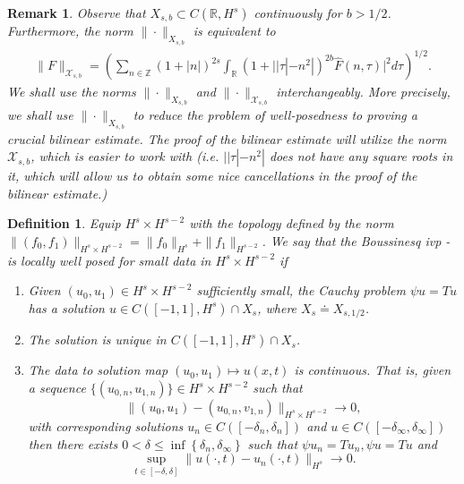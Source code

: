 \documentclass[12pt,reqno]{amsart}
\numberwithin{equation}{section}  %
\renewcommand{\cref}{\Cref}
\newcommand{\rr}{\mathbb{R}}
\newcommand{\zz}{\mathbb{Z}}
\newcommand{\wh}{\widehat}
\newtheorem{definition}[theorem]{Definition}
\newtheorem{remark}[theorem]{Remark}
\begin{document}
%
\begin{remark}
  Observe that $X_{s,b} \subset C(\rr, H^{s})$ continuously for $b>1/2$. Furthermore, the norm $\| \cdot \|_{X_{s,b}}$ is equivalent to
  \begin{equation*}
  \begin{split}
    \| F \|_{\mathcal{X}_{s,b}}
    = \left( \sum_{n \in \zz} (1 + |n|)^{2s} \int_{\rr}
    (1 + ||\tau| - n^{2} |)^{2b} \wh{F}(n, \tau)|^{2} d \tau\right)^{1/2}.
  \end{split}
  \end{equation*}
  We shall use the norms $\| \cdot \|_{X_{s,b}}$ and $\| \cdot \|_{\mathcal{X}_{s,b}}$ interchangeably. More precisely, we shall use $\| \cdot \|_{X_{s,b}}$ to reduce the problem of well-posedness to proving a crucial bilinear estimate. The proof of the bilinear estimate will utilize the norm $\mathcal{X}_{s,b}$, which is easier to work with (i.e. $ | | \tau | - n^{2} |$ does not have any square roots in it, which will allow us to obtain some nice cancellations in the proof of the bilinear estimate.)   
\end{remark}
%
%
%
%
%
%
%
%
\begin{definition}
  Equip $H^{s} \times H^{s-2}$ with the 
  topology defined by the norm $\|(f_0, f_1)\|_{H^{s} \times H^{s-2}}
  = \|f_0\|_{H^{s}} + \|f_1\|_{H^{s-2}}$.
   We say that the Boussinesq ivp
  \cref{eqn:mb-2}-\cref{eqn:mb-init-data-2} is
	\emph{locally well posed} for small data in
  $H^s \times H^{s-2}$ if 
	\begin{enumerate}
    \item Given $(u_{0}, u_{1}) \in H^{s} \times H^{s-2}$
      sufficiently small, the Cauchy problem
      $\psi u = Tu$ has a solution $u \in C([-1,
      1], H^s) \cap X_{s}$, where $X_{s} \doteq X_{s,1/2}$. 
    \item The solution is unique in $C([-1, 1], H^{s}) \cap
      X_{s}$.
    \item
      The data to solution map $(u_0, u_{1}) \mapsto u(x,t)$ is continuous. That
      is, given a sequence $\{(u_{0,n}, u_{1,n} ) \} \in H^{s} \times H^{s-2}$
      such that $$\|(u_{0}, u_{1})
      - (u_{0,n}, v_{1,n}) \|_{H^{s} \times
      H^{s-2}} \to 0,$$ with corresponding solutions $u_{n} \in
      C([-\delta_{n},
      \delta_{n}])$ and $u \in C([-\delta_{\infty}, \delta_{\infty}])$
      then there exists $0 < \delta \le \inf\left\{
      \delta_{n}, \delta_{\infty} \right\}$ such that $\psi u_{n} =
      Tu_{n}, \psi u = Tu$ and 
      $$\sup_{t \in [-\delta, \delta]}
      \|u(\cdot, t) - u_{n}(\cdot, t) \|_{H^s} \to 0.$$
  \end{enumerate}
\end{definition}
%
\end{document}
